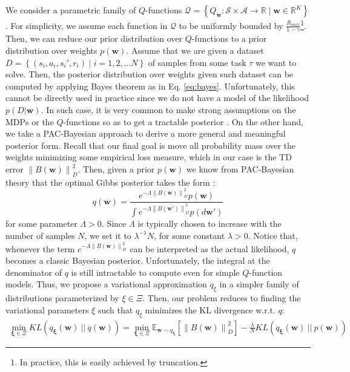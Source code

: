 \documentclass{article}
\newcommand{\norm}[1]{\left\lVert #1 \right\rVert}
\begin{document}
We consider a parametric family of $Q$-functions $\mathcal{Q} = \left\{ Q_{\bm{w}} : \mathcal{S}\times\mathcal{A} \rightarrow \mathbb{R} \mid \bm{w}\in\mathbb{R}^K\right\}$. For simplicity, we assume each function in $\mathcal{Q}$ to be uniformly bounded by $\frac{R_{max}}{1-\gamma}$\footnote{In practice, this is easily achieved by truncation.}. Then, we can reduce our prior distribution over $Q$-functions to a prior distribution over weights $p(\bm{w})$. Assume that we are given a dataset $D=\left\{(s_i,a_i,s_i',r_i) \mid i = 1,2,\dots N\right\}$ of samples from some task $\tau$ we want to solve. Then, the posterior distribution over weights given such dataset can be computed by applying Bayes theorem as in Eq. \ref{eq:bayes}. Unfortunately, this cannot be directly used in practice since we do not have a model of the likelihood $p(D|\bm{w})$. In such case, it is very common to make strong assumptions on the MDPs or the $Q$-functions so as to get a tractable posterior \cite{}. On the other hand, we take a PAC-Bayesian approach to derive a more general and meaningful posterior form. Recall that our final goal is move all probability mass over the weights minimizing some empirical loss measure, which in our case is the TD error $\norm{B(\bm{w})}_D^2$. Then, given a prior $p(\bm{w})$ we know from PAC-Bayesian theory that the optimal Gibbs posterior takes the form \cite{}:
\begin{equation}
q(\bm{w}) = \frac{e^{-\Lambda\norm{B(\bm{w})}_D^2}p(\bm{w})}{\int e^{-\Lambda\norm{B(\bm{w}')}_D^2}p(d\bm{w}')}
\end{equation}
for some parameter $\Lambda > 0$. Since $\Lambda$ is typically chosen to increase with the number of samples $N$, we set it to $\lambda^{-1}N$, for some constant $\lambda > 0$. Notice that, whenever the term $e^{-\Lambda\norm{B(\bm{w})}_D^2}$ can be interpreted as the actual likelihood, $q$ becomes a classic Bayesian posterior. Unfortunately, the integral at the denominator of $q$ is still intractable to compute even for simple $Q$-function models. Thus, we propose a variational approximation $q_{\xi}$ in a simpler family of distributions parameterized by $\xi \in \Xi$. Then, our problem reduces to finding the variational parameters $\xi$ such that $q_{\xi}$ minimizes the KL divergence w.r.t. $q$:
\begin{align} \label{eq:elbo}
\min_{\bm{\xi}\in\Xi} KL\left(q_{\bm{\xi}}(\bm{w})\ ||\ q(\bm{w})\right) = \min_{\bm{\xi}\in\Xi}\mathbb{E}_{\bm{w} \sim q_{\bm{\xi}}}\left[\norm{B(\bm{w})}_D^2\right] - \frac{\lambda}{N}KL\left(q_{\bm{\xi}}(\bm{w})\ ||\ p(\bm{w})\right)
\end{align}
\end{document}
